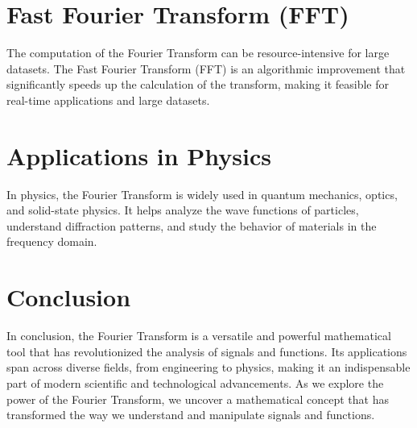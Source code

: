 \documentclass{article}
\begin{document}
\section*{Fast Fourier Transform (FFT)}
The computation of the Fourier Transform can be resource-intensive for large datasets. The Fast Fourier Transform (FFT) is an algorithmic improvement that significantly speeds up the calculation of the transform, making it feasible for real-time applications and large datasets.

\section*{Applications in Physics}
In physics, the Fourier Transform is widely used in quantum mechanics, optics, and solid-state physics. It helps analyze the wave functions of particles, understand diffraction patterns, and study the behavior of materials in the frequency domain.

\section*{Conclusion}
In conclusion, the Fourier Transform is a versatile and powerful mathematical tool that has revolutionized the analysis of signals and functions. Its applications span across diverse fields, from engineering to physics, making it an indispensable part of modern scientific and technological advancements. As we explore the power of the Fourier Transform, we uncover a mathematical concept that has transformed the way we understand and manipulate signals and functions.
\end{document}
